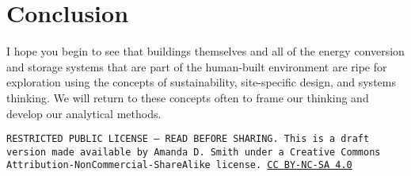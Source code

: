 \documentclass[10pt]{article}
\begin{document}
\section{Conclusion}

I hope you begin to see that buildings themselves and all of the energy conversion and storage systems that are part of the human-built environment are ripe for exploration using the concepts of sustainability, site-specific design, and systems thinking. We will return to these concepts often to frame our thinking and develop our analytical methods.



\bigskip

\noindent
\texttt{\footnotesize RESTRICTED PUBLIC LICENSE --- READ BEFORE SHARING. This is a draft version made available by Amanda D. Smith under a Creative Commons Attribution-NonCommercial-ShareAlike license. 
\href{https://creativecommons.org/licenses/by-nc-sa/4.0/}{CC BY-NC-SA 4.0}}

\newpage

\printbibliography
\end{document}

